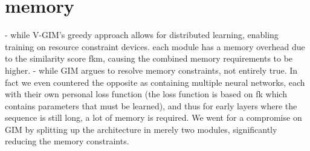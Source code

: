 \section{memory}
		- while V-GIM's greedy approach allows for distributed learning, enabling training on resource constraint devices. each module has a memory overhead due to the similarity score fkm, causing the combined memory requirements to be higher.
		- while GIM argues to resolve memory constraints, not entirely true. In fact we even countered the opposite as containing multiple neural networks, each with their own personal loss function (the loss function is based on fk which contains parameters that must be learned), and thus for early layers where the sequence is still long, a lot of memory is required. We went for a compromise on GIM by splitting up the architecture in merely two modules, significantly reducing the memory constraints.
	








%









